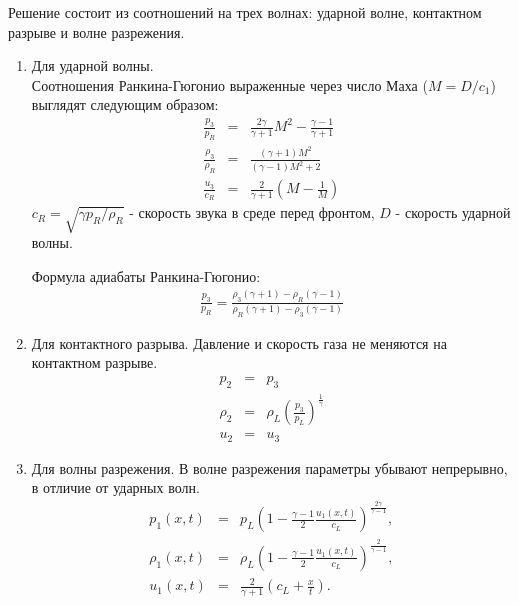 \documentclass[a4paper,12pt]{extarticle}
\begin{document}
Решение состоит из соотношений на трех волнах: ударной волне, контактном разрыве и волне разрежения. 
\begin{enumerate}
    \item Для ударной волны. \\
    Соотношения Ранкина-Гюгонио выраженные через число Маха ($M= D/c_1$) выглядят следующим образом:
    \begin{eqnarray}
        \frac{p_3}{p_R} & = & \frac{2\gamma}{\gamma+1}M^2-\frac{\gamma-1}{\gamma+1} \\
        \frac{\rho_3}{\rho_R} & = & \frac{(\gamma+1)M^2}{(\gamma-1)M^2+2} \\
        \frac{u_3}{c_R} & = & \frac{2}{\gamma+1}(M-\frac{1}{M})
    \end{eqnarray} 
    $c_R = \sqrt{\gamma p_R / \rho_R}$  - скорость звука в среде перед фронтом, $D$ - скорость ударной волны.
    
    Формула адиабаты Ранкина-Гюгонио:
    \begin{align}
        \frac{p_3}{p_R}=\frac{\rho_3(\gamma+1)-\rho_R(\gamma-1)}{\rho_R(\gamma+1)-\rho_3(\gamma-1)}
    \end{align}

    \item Для контактного разрыва.
    Давление и скорость газа не меняются на контактном разрыве. 
    \begin{eqnarray}
        p_2&=&p_3\\
        \rho_2&=&\rho_L \left( \frac{p_3}{p_L} \right)^\frac{1}{\gamma}\\
        u_2&= &u_3
    \end{eqnarray} 
    \item Для волны разрежения.
    В волне разрежения параметры убывают непрерывно, в отличие от ударных волн.
    \begin{eqnarray}
        p_1(x,t)&=&p_L \left( 1-\frac{\gamma-1}{2}\frac{u_1(x,t)}{c_L} \right)^\frac{2\gamma}{\gamma-1},\\
        \rho_1(x,t)&=&\rho_L \left( 1-\frac{\gamma-1}{2}\frac{u_1(x,t)}{c_L} \right)^\frac{2}{\gamma-1},\\
        u_1(x,t) &=& \frac{2}{\gamma+1}(c_L + \frac{x}{t}).
    \end{eqnarray} 
\end{enumerate}
    
\end{document}
